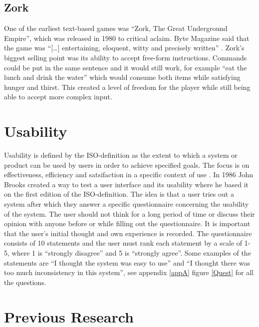 \subsection{Zork}
One of the earliest text-based games was ``Zork, The Great Underground Empire'', which was released in 1980 to critical aclaim. Byte Magazine said that the game was ``[\ldots] entertaining, eloquent, witty and precisely written''  \citep[page 264]{Byte}. Zork's biggest selling point was its ability to accept free-form instructions. Commands could be put in the same sentence and it would still work, for example ``eat the lunch and drink the water'' which would consume both items while satisfying hunger and thirst. This created a level of freedom for the player while still being able to accept more complex input.\citep{Byte}

\section{Usability} \label{usability}
Usability is defined by the ISO-definition as the extent to which a system or product can be used by users in order to achieve specified goals. The focus is on effectiveness, efficiency and satsifaction in a specific context of use \citep{ISO}. In 1986 John Brooks created a way to test a user interface and its usability where he based it on the first edition of the ISO-definition. The idea is that a user tries out a system after which they answer a specific questionnaire concerning the usability of the system. The user should not think for a long period of time or discuss their opinion with anyone before or while filling out the questionnaire. It is important that the user’s initial thought and own experience is recorded. The questionnaire consists of 10 statements and the user must rank each statement by a scale of 1-5, where 1 is “strongly disagree” and 5 is “strongly agree”. Some examples of the statements are “I thought the system was easy to use” and “I thought there was too much inconsistency in this system”, see appendix \ref{appA} figure \ref{Quest} for all the questions. \citep{Broo}

\section{Previous Research}

